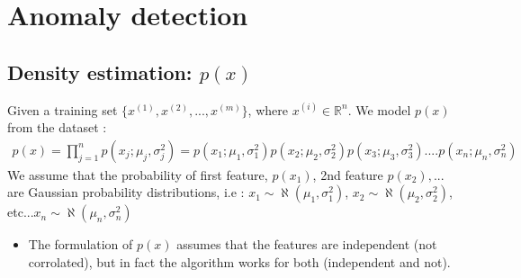 \documentclass[a4paper,12pt]{report}
\begin{document}
\section{Anomaly detection}
\subsection{Density estimation: $p(x)$}
Given a training set  $\{ x^{(1)}, x^{(2)}, ..., x^{(m)}  \}$, where $x^{(i)} \in \mathbb{R}^n$. We model $p(x)$ from the dataset :
\begin{align}
p(x) = \prod _{j=1} ^n p(x_j; \mu_j, \sigma_j ^2) = p(x_1; \mu_1, \sigma_1 ^2) p(x_2; \mu_2, \sigma_2 ^2) p(x_3; \mu_3, \sigma_3 ^2) ....p(x_n; \mu_n, \sigma_n ^2) 
\end{align}
We assume that the probability of first feature, $p(x_1)$, 2nd feature $p(x_2),...$ are Gaussian probability distributions, i.e : $x_1 \sim \aleph(\mu_1, \sigma_1 ^2)$, $x_2 \sim \aleph(\mu_2, \sigma_2 ^2)$, etc...$x_n \sim \aleph(\mu_n, \sigma_n ^2)$
\begin{itemize}
\item The formulation of $p(x)$ assumes that the features are independent (not corrolated), but in fact the algorithm works for both (independent and not).
\end{itemize}
\end{document}
